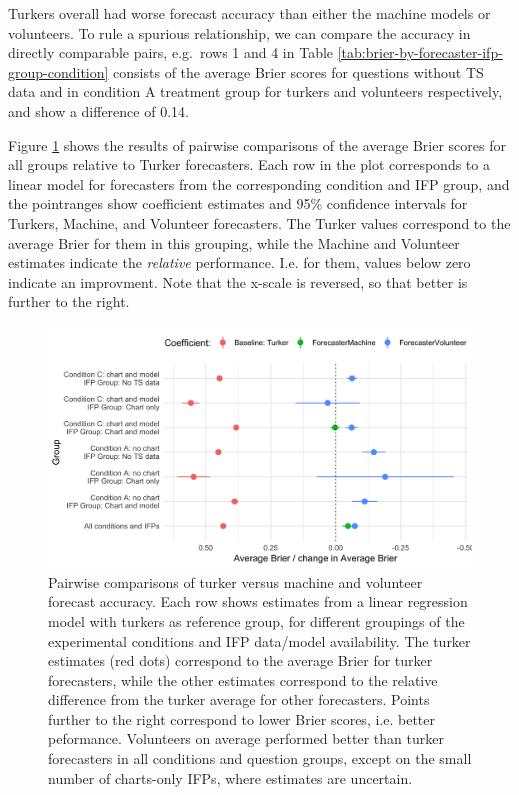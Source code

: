 \documentclass[]{article}
\begin{document}
Turkers overall had worse forecast accuracy than either the machine
models or volunteers. To rule a spurious relationship, we can compare
the accuracy in directly comparable pairs, e.g.~rows 1 and 4 in Table
\ref{tab:brier-by-forecaster-ifp-group-condition} consists of the
average Brier scores for questions without TS data and in condition A
treatment group for turkers and volunteers respectively, and show a
difference of 0.14.

Figure \ref{fig:turkers} shows the results of pairwise comparisons of
the average Brier scores for all groups relative to Turker forecasters.
Each row in the plot corresponds to a linear model for forecasters from
the corresponding condition and IFP group, and the pointranges show
coefficient estimates and 95\% confidence intervals for Turkers,
Machine, and Volunteer forecasters. The Turker values correspond to the
average Brier for them in this grouping, while the Machine and Volunteer
estimates indicate the \emph{relative} performance. I.e. for them,
values below zero indicate an improvment. Note that the x-scale is
reversed, so that better is further to the right.

\begin{figure}
\label{fig:turkers}
\caption{Pairwise comparisons of turker versus machine and volunteer forecast accuracy. Each row shows estimates from a linear regression model with turkers as reference group, for different groupings of the experimental conditions and IFP data/model availability. The turker estimates (red dots) correspond to the average Brier for turker forecasters, while the other estimates correspond to the relative difference from the turker average for other forecasters. Points further to the right correspond to lower Brier scores, i.e. better peformance. Volunteers on average performed better than turker forecasters in all conditions and question groups, except on the small number of charts-only IFPs, where estimates are uncertain.}
\includegraphics{../output/figures/pairwise-comparisons-turker.png}
\end{figure}
\end{document}
